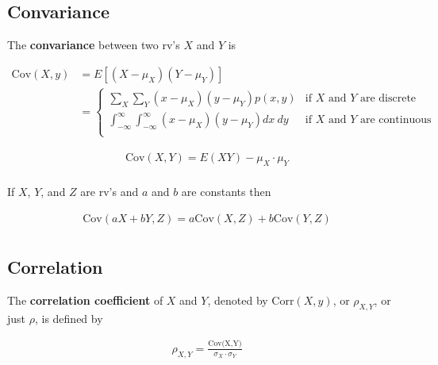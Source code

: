 \subsection{Convariance}

\begin{definition}
    The \textbf{convariance } between two rv's $X$ and $Y$ is 

    \begin{align*}
        \text{Cov}(X,y) & = E[(X-\mu_X)(Y-\mu_Y)] \\
        & = \left\{\begin{array}{cl}
            \sum_X\sum_Y(x-\mu_X)(y-\mu_Y)p(x,y) & \text{if }X\text{ and }Y\text{ are discrete} \\
            \int_{-\infty}^\infty \int_{-\infty}^\infty (x-\mu_X)(y-\mu_Y)dx\ dy & \text{if }X\text{ and }Y\text{ are continuous} \\
        \end{array}\right.
    \end{align*}
\end{definition}

\begin{proposition}
    \begin{align*}
        \text{Cov}(X,Y) = E(XY) - \mu_X\cdot \mu_Y \\
    \end{align*}
\end{proposition}

\begin{proposition}
    If $X$, $Y$, and $Z$ are rv's and $a$ and $b$ are constants then 

    \begin{align*}
        \text{Cov}(aX+bY,Z) = a\text{Cov}(X,Z) + b\text{Cov}(Y,Z) \\
    \end{align*}
\end{proposition}

\subsection{Correlation}

\begin{definition}
    The \textbf{correlation coefficient} of $X$ and $Y$, denoted by Corr$(X,y)$, or $\rho_{X,Y}$, or just $\rho$, is defined by 

    \begin{align*}
        \rho_{X,Y} = \frac{\text{Cov(X,Y)}}{\sigma_X\cdot\sigma_Y} \\
    \end{align*}
\end{definition}

